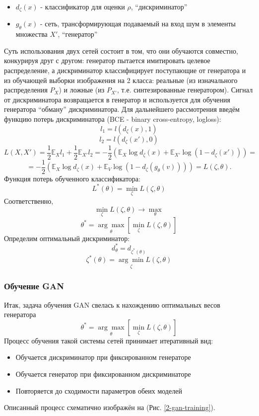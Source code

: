 			\begin{itemize}
				\item $d_{\zeta}(x)$ - классификатор для оценки $\rho$, ``дискриминатор''
				\item $g_{\theta}(x)$ - сеть, трансформирующая подаваемый на вход шум в элементы множества $X'$, ``генератор''
			\end{itemize}
	
			Суть использования двух сетей состоит в том, что они обучаются совместно, конкурируя друг с другом: генератор пытается имитировать целевое распределение, а дискриминатор классифицирует поступающие от генератора и из обучающей выборки изображения на 2 класса: реальные (из изначального распределения $P_X$) и ложные (из $P_{X'}$, т.е. синтезированные генератором). Сигнал от дискриминатора возвращается в генератор и используется для обучения генератора ``обману'' дискриминатора.
			Для дальнейшего рассмотрения введём функцию потерь дискриминатора (BCE - binary cross-entropy, logloss):
			$$ l_1 = l(d_{\zeta}(x), 1) $$
			$$ l_2 = l(d_{\zeta}(x'), 0) $$
			$$ L(X, X') = \frac{1}{2} \mathbb{E}_{X} l_1 + \frac{1}{2} \mathbb{E}_{X'} l_2 = -\frac{1}{2} (\mathbb{E}_{X} \log d_{\zeta}(x) + \mathbb{E}_{X'} \log (1 - d_{\zeta}(x'))) = $$
			$$ =  -\frac{1}{2} (\mathbb{E}_{X} \log d_{\zeta}(x) + \mathbb{E}_{V} \log (1 - d_{\zeta}(g_{\theta}(v)))) = L(\zeta, \theta) .$$
			Функция потерь обученного классификатора:
			$$ L^*(\theta) = \underset{\zeta}{\min} L(\zeta, \theta) $$
			Соответственно,
			$$ \underset{\zeta}{\min} L(\zeta, \theta) \longrightarrow \underset{\theta}{\max} $$
			$$ \theta^* = \underset{\theta}{\arg\max} \left[ \underset{\zeta}{\min} L(\zeta, \theta) \right] $$
			Определим оптимальный дискриминатор:
			$$ d^*_{\theta} = d_{\zeta^*(\theta)} $$
			$$ \zeta^*(\theta) =  \underset{\zeta}{\arg\min} L(\zeta, \theta)$$
			
		\subsubsection{Обучение GAN}
			Итак, задача обучения GAN свелась к нахождению оптимальных весов генератора
			$$ \theta^* = \underset{\theta}{\arg\max} \left[ \underset{\zeta}{\min} L(\zeta, \theta) \right] $$
			Процесс обучения такой системы сетей принимает итеративный вид:
	
			\begin{itemize}
				\item Обучается дискриминатор при фиксированном генераторе
				\item Обучается генератор при фиксированном дискриминаторе
				\item Повторяется до сходимости параметров обеих моделей
			\end{itemize}
			Описанный процесс схематично изображён на (Рис. \ref{2-gan-training}).
	
